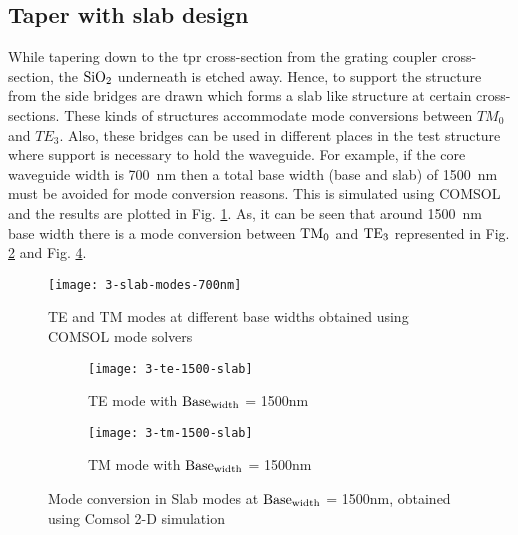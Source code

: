 \documentclass[../report.tex]{subfiles}
\begin{document}
\subsection{Taper with slab design}
While tapering down to the \gls{tpr} cross-section from the grating coupler cross-section, the $\mathrm{SiO_{2}}$ underneath is etched away. Hence, to support the structure from the side bridges are drawn which forms a slab like structure at certain cross-sections. These kinds of structures accommodate mode conversions between $TM_0$ and $TE_3$. Also, these bridges can be used in different places in the test structure where support is necessary to hold the waveguide. For example, if the core waveguide width is \SI{700}{\nano\meter} then a total base width (base and slab) of \SI{1500}{\nano\meter} must be avoided for mode conversion reasons. This is simulated using COMSOL and the results are plotted in Fig. \ref{fig:3_slab_modes_700nm}. As, it can be seen that around \SI{1500}{\nano\meter} base width there is a mode conversion between $\mathrm{TM_0}$ and $\mathrm{TE_3}$ represented in Fig. \ref{fig:3_te_1500_slab} and Fig. \ref{fig:3_tm_1500_slab}. 
 
 \begin{figure}[H] %
 	\centering
 	\texttt{[image: 3-slab-modes-700nm]}
 	\caption{TE and TM modes at different base widths obtained using COMSOL mode solvers}
 	\label{fig:3_slab_modes_700nm}
 \end{figure}
 
 \begin{figure}[H] %
 	\begin{subfigure}[t]{0.45\textwidth}
 		\texttt{[image: 3-te-1500-slab]}
 		\caption{TE mode with $\mathrm{Base_{width}}$ = 1500nm}
 		\label{fig:3_te_1500_slab}
 	\end{subfigure}
 	\hfill
 	\begin{subfigure}[t]{0.45\textwidth}
 		\texttt{[image: 3-tm-1500-slab]}
 		\caption{TM mode with $\mathrm{Base_{width}}$ = 1500nm}
 		\label{fig:3_tm_1500_slab}
 	\end{subfigure}
 	\caption{Mode conversion in Slab modes at $\mathrm{Base_{width}}$ = 1500nm, obtained using Comsol 2-D simulation}
 \end{figure}
\end{document}
